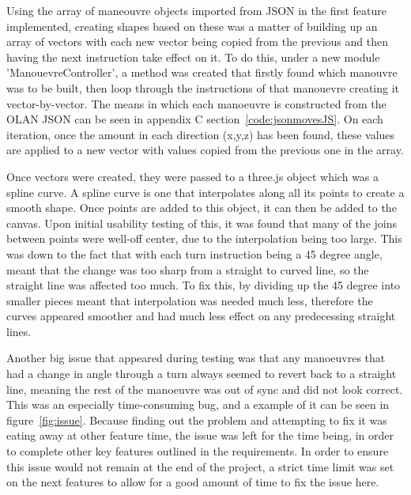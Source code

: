 Using the array of maneouvre objects imported from JSON in the first feature implemented, creating shapes based on these was a matter of building up an array of vectors with each new vector being copied from the previous and then having the next instruction take effect on it. To do this, under a new module 'ManouevreController', a method was created that firstly found which manouvre was to be built, then loop through the instructions of that manouevre creating it vector-by-vector. The means in which each manoeuvre is constructed from the OLAN JSON can be seen in appendix C section~\ref{code:jsonmovesJS}. On each iteration, once the amount in each direction (x,y,z) has been found, these values are applied to a new vector with values copied from the previous one in the array.

Once vectors were created, they were passed to a three.js object which was a spline curve. A spline curve is one that interpolates along all its points to create a smooth shape. Once points are added to this object, it can then be added to the canvas. Upon initial usability testing of this, it was found that many of the joins between points were well-off center, due to the interpolation being too large. This was down to the fact that with each turn instruction being a 45 degree angle, meant that the change was too sharp from a straight to curved line, so the straight line was affected too much. To fix this, by dividing up the 45 degree into smaller pieces meant that interpolation was needed much less, therefore the curves appeared smoother and had much less effect on any predecessing straight lines.

Another big issue that appeared during testing was that any manoeuvres that had a change in angle through a turn always seemed to revert back to a straight line, meaning the rest of the manoeuvre was out of sync and did not look correct. This was an especially time-consuming bug, and a example of it can be seen in figure~\ref{fig:issue}. Because finding out the problem and attempting to fix it was eating away at other feature time, the issue was left for the time being, in order to complete other key features outlined in the requirements. In order to ensure this issue would not remain at the end of the project, a strict time limit was set on the next features to allow for a good amount of time to fix the issue here.

